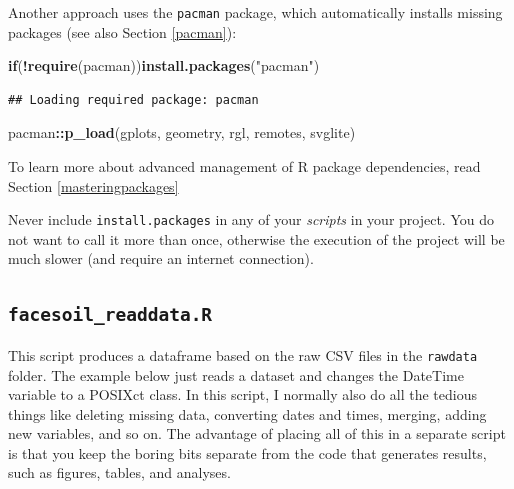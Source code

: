 \documentclass[]{book}
\newenvironment{Shaded}{\begin{snugshade}}{\end{snugshade}}
\newcommand{\ControlFlowTok}[1]{\textcolor[rgb]{0.13,0.29,0.53}{\textbf{#1}}}
\newcommand{\KeywordTok}[1]{\textcolor[rgb]{0.13,0.29,0.53}{\textbf{#1}}}
\newcommand{\NormalTok}[1]{#1}
\newcommand{\OperatorTok}[1]{\textcolor[rgb]{0.81,0.36,0.00}{\textbf{#1}}}
\newcommand{\StringTok}[1]{\textcolor[rgb]{0.31,0.60,0.02}{#1}}
\let\BeginKnitrBlock\begin \let\EndKnitrBlock\end
\begin{document}
Another approach uses the \texttt{pacman} package, which automatically installs missing packages (see also Section \ref{pacman}):

\begin{Shaded}
\begin{Highlighting}[]
\ControlFlowTok{if}\NormalTok{(}\OperatorTok{!}\KeywordTok{require}\NormalTok{(pacman))}\KeywordTok{install.packages}\NormalTok{(}\StringTok{"pacman"}\NormalTok{)}
\end{Highlighting}
\end{Shaded}

\begin{verbatim}
## Loading required package: pacman
\end{verbatim}

\begin{Shaded}
\begin{Highlighting}[]
\NormalTok{pacman}\OperatorTok{::}\KeywordTok{p_load}\NormalTok{(gplots, geometry, rgl, remotes, svglite)}
\end{Highlighting}
\end{Shaded}

\BeginKnitrBlock{rmdreading}
To learn more about advanced management of R package dependencies, read Section \ref{masteringpackages}
\EndKnitrBlock{rmdreading}

\BeginKnitrBlock{rmdcaution}
Never include \texttt{install.packages} in any of your \emph{scripts} in your project. You do not want to call it more than once, otherwise the execution of the project will be much slower (and require an internet connection).
\EndKnitrBlock{rmdcaution}

\hypertarget{facesoil_readdata.r}{%
\subsection{\texorpdfstring{\texttt{facesoil\_readdata.R}}{facesoil\_readdata.R}}\label{facesoil_readdata.r}}

This script produces a dataframe based on the raw CSV files in the \texttt{rawdata} folder. The example below just reads a dataset and changes the DateTime variable to a POSIXct class. In this script, I normally also do all the tedious things like deleting missing data, converting dates and times, merging, adding new variables, and so on. The advantage of placing all of this in a separate script is that you keep the boring bits separate from the code that generates results, such as figures, tables, and analyses.
\end{document}
